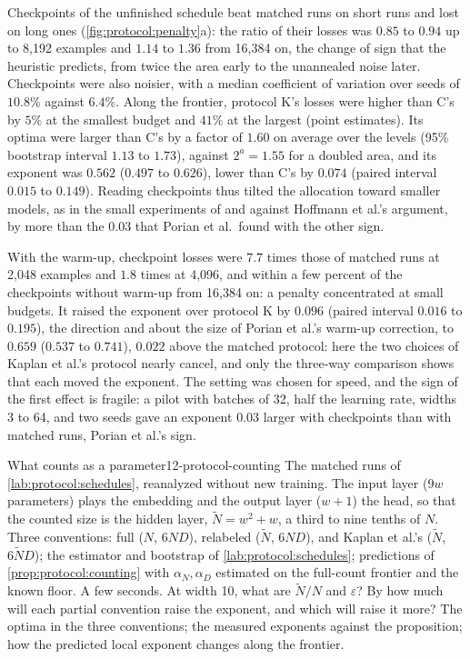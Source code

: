 \begin{refsection}
Checkpoints of the unfinished schedule beat matched runs on short runs and lost on long ones (\cref{fig:protocol:penalty}a): the ratio of their losses was $0.85$ to $0.94$ up to 8,192 examples and $1.14$ to $1.36$ from 16,384 on, the change of sign that the heuristic predicts, from twice the area early to the unannealed noise later. Checkpoints were also noisier, with a median coefficient of variation over seeds of $10.8\%$ against $6.4\%$. Along the frontier, protocol K's losses were higher than C's by $5\%$ at the smallest budget and $41\%$ at the largest (point estimates). Its optima were larger than C's by a factor of $1.60$ on average over the levels (95\% bootstrap interval $1.13$ to $1.73$), against $2^{a}=1.55$ for a doubled area, and its exponent was $0.562$ ($0.497$ to $0.626$), lower than C's by $0.074$ (paired interval $0.015$ to $0.149$). Reading checkpoints thus tilted the allocation toward smaller models, as in the small experiments of \textcite{PearceSong2024} and against Hoffmann et al.'s argument, by more than the $0.03$ that Porian et al.\ found with the other sign.

With the warm-up, checkpoint losses were $7.7$ times those of matched runs at 2,048 examples and $1.8$ times at 4,096, and within a few percent of the checkpoints without warm-up from 16,384 on: a penalty concentrated at small budgets. It raised the exponent over protocol K by $0.096$ (paired interval $0.016$ to $0.195$), the direction and about the size of Porian et al.'s warm-up correction, to $0.659$ ($0.537$ to $0.741$), $0.022$ above the matched protocol: here the two choices of Kaplan et al.'s protocol nearly cancel, and only the three-way comparison shows that each moved the exponent. The setting was chosen for speed, and the sign of the first effect is fragile: a pilot with batches of 32, half the learning rate, widths 3 to 64, and two seeds gave an exponent $0.03$ larger with checkpoints than with matched runs, Porian et al.'s sign.

\begin{lab}{What counts as a parameter}{12-protocol-counting}\label{lab:protocol:counting}
 The matched runs of \cref{lab:protocol:schedules}, reanalyzed without new training. The input layer ($9w$ parameters) plays the embedding and the output layer ($w+1$) the head, so that the counted size is the hidden layer, $\tilde N=w^2+w$, a third to nine tenths of $N$. Three conventions: full ($N$, $6ND$), relabeled ($\tilde N$, $6ND$), and Kaplan et al.'s ($\tilde N$, $6\tilde ND$); the estimator and bootstrap of \cref{lab:protocol:schedules}; predictions of \cref{prop:protocol:counting} with $\alpha_N,\alpha_D$ estimated on the full-count frontier and the known floor. A few seconds.
 At width 10, what are $\tilde N/N$ and $\varepsilon$? By how much will each partial convention raise the exponent, and which will raise it more?
 The optima in the three conventions; the measured exponents against the proposition; how the predicted local exponent changes along the frontier.
\end{lab}


\end{refsection}

